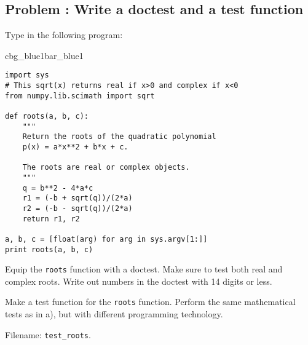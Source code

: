 \documentclass[graybox,sectrefs,envcountresetchap,open=right,final]{svmonodo}
\newenvironment{_pro_tight}[2]{
   \def\FrameCommand{\color{#2}\vrule width 1mm\normalcolor\colorbox{#1}}
   \FrameRule0.6pt\MakeFramed {\advance\hsize-2mm\FrameRestore}\vskip3mm}
   {\vskip0mm\endMakeFramed}
\newenvironment{pro}[2]{
\bgroup\rmfamily
\fboxsep=0mm\relax
\begin{_pro_tight}{#1}{#2}
\list{}{\parsep=-2mm\parskip=0mm\topsep=0pt\leftmargin=2mm
\rightmargin=2\leftmargin\leftmargin=4pt\relax}
\item\relax}
{\endlist\end{_pro_tight}\egroup}
\newenvironment{doconceexercise}{}{}
\newcounter{doconceexercisecounter}
\begin{document}
\begin{doconceexercise}

\subsection*{Problem \thedoconceexercisecounter: Write a doctest and a test function}

\label{softeng1:exer:doctest1}

Type in the following program:

\begin{pro}{cbg_blue1}{bar_blue1}\begin{Verbatim}[numbers=none,fontsize=\fontsize{9pt}{9pt},baselinestretch=0.95,xleftmargin=2mm]
import sys
# This sqrt(x) returns real if x>0 and complex if x<0
from numpy.lib.scimath import sqrt

def roots(a, b, c):
    """
    Return the roots of the quadratic polynomial
    p(x) = a*x**2 + b*x + c.

    The roots are real or complex objects.
    """
    q = b**2 - 4*a*c
    r1 = (-b + sqrt(q))/(2*a)
    r2 = (-b - sqrt(q))/(2*a)
    return r1, r2

a, b, c = [float(arg) for arg in sys.argv[1:]]
print roots(a, b, c)
\end{Verbatim}
\end{pro}
\noindent


Equip the \texttt{roots} function with a doctest.
Make sure to test both real and complex roots.
Write out numbers in the doctest with 14 digits or less.

Make a test function for the \texttt{roots} function. Perform the
same mathematical tests as in a), but with different
programming technology.

\noindent Filename: \Verb!test_roots!.

\end{doconceexercise}
\end{document}
